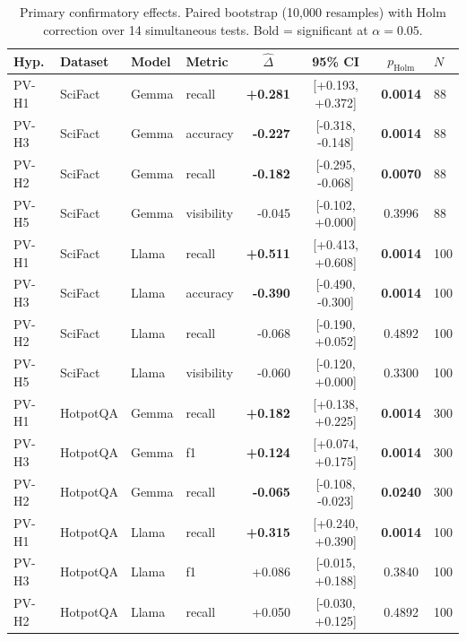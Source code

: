 \begin{table}[t]
\centering
\caption{Primary confirmatory effects. Paired bootstrap (10{,}000 resamples) with Holm correction over 14 simultaneous tests. Bold = significant at $\alpha=0.05$.}
\label{tab:effects}
\small
\begin{tabular}{llllrccl}
\toprule
Hyp. & Dataset & Model & Metric & \multicolumn{1}{c}{$\hat{\Delta}$} & 95\% CI & $p_\text{Holm}$ & $N$ \\
\midrule
PV-H1 & SciFact & Gemma & recall & \textbf{+0.281} & [+0.193, +0.372] & \textbf{0.0014} & 88 \\
PV-H3 & SciFact & Gemma & accuracy & \textbf{-0.227} & [-0.318, -0.148] & \textbf{0.0014} & 88 \\
PV-H2 & SciFact & Gemma & recall & \textbf{-0.182} & [-0.295, -0.068] & \textbf{0.0070} & 88 \\
PV-H5 & SciFact & Gemma & visibility & -0.045 & [-0.102, +0.000] & 0.3996 & 88 \\
PV-H1 & SciFact & Llama & recall & \textbf{+0.511} & [+0.413, +0.608] & \textbf{0.0014} & 100 \\
PV-H3 & SciFact & Llama & accuracy & \textbf{-0.390} & [-0.490, -0.300] & \textbf{0.0014} & 100 \\
PV-H2 & SciFact & Llama & recall & -0.068 & [-0.190, +0.052] & 0.4892 & 100 \\
PV-H5 & SciFact & Llama & visibility & -0.060 & [-0.120, +0.000] & 0.3300 & 100 \\
PV-H1 & HotpotQA & Gemma & recall & \textbf{+0.182} & [+0.138, +0.225] & \textbf{0.0014} & 300 \\
PV-H3 & HotpotQA & Gemma & f1 & \textbf{+0.124} & [+0.074, +0.175] & \textbf{0.0014} & 300 \\
PV-H2 & HotpotQA & Gemma & recall & \textbf{-0.065} & [-0.108, -0.023] & \textbf{0.0240} & 300 \\
PV-H1 & HotpotQA & Llama & recall & \textbf{+0.315} & [+0.240, +0.390] & \textbf{0.0014} & 100 \\
PV-H3 & HotpotQA & Llama & f1 & +0.086 & [-0.015, +0.188] & 0.3840 & 100 \\
PV-H2 & HotpotQA & Llama & recall & +0.050 & [-0.030, +0.125] & 0.4892 & 100 \\
\bottomrule
\end{tabular}
\end{table}